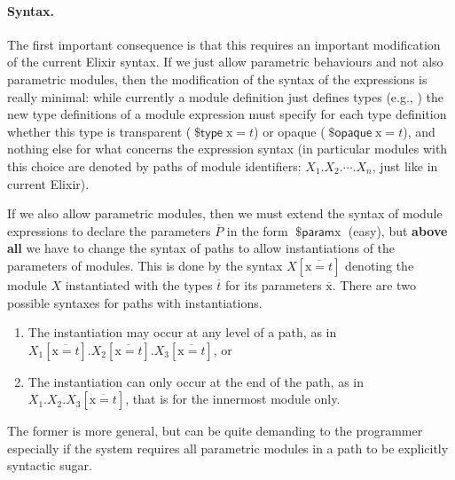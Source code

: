 \documentclass[a4paper,10pt]{article}
\DeclareMathOperator{\kwprm}{\textsf{\$param}}
\DeclareMathOperator{\kwopq}{\textsf{\$opaque}}
\DeclareMathOperator{\kwtp}{\textsf{\$type}}
\newcommand{\tx}{\textrm{x}}
\begin{document}
\paragraph{Syntax.} The first important consequence is that this requires an important modification of the current Elixir syntax. If we just allow parametric behaviours and not also parametric modules, then the modification of the syntax of the expressions is really minimal: while currently a module definition just defines types (e.g., ) the new type definitions of a module expression must specify for each type definition whether this type is transparent ($\kwtp \tx = t$) or opaque ($\kwopq \tx = t$), and nothing else for what concerns the expression syntax (in particular modules with this choice are denoted by paths of module identifiers: $X_1.X_2.\cdots{.}X_n$, just like in current Elixir).

If we also allow parametric modules, then we must extend the syntax of module expressions to declare the parameters $\overline P$ in the form $\kwprm \tx$ (easy), but \textbf{above all} we have to change the syntax of paths to allow instantiations of the parameters of modules. This is done by the syntax $X[\overline{\tx=t}]$ denoting the module $X$ instantiated with the types $\overline{t}$ for its parameters $\overline{\tx}$. 
There are two possible syntaxes for paths with instantiations.
\begin{enumerate}
\item The instantiation may occur at any level of a path, as in $X_1[\overline{\tx=t}].X_2[\overline{\tx=t}].X_3[\overline{\tx=t}]$, or
\item The instantiation can only occur at the end of the path, as in $X_1.X_2.X_3[\overline{\tx=t}]$, that is for the innermost module only.
\end{enumerate}
 The former is more general, but can be quite demanding to the programmer especially if the system requires all parametric modules in a path to be explicitly syntactic sugar.
\end{document}

